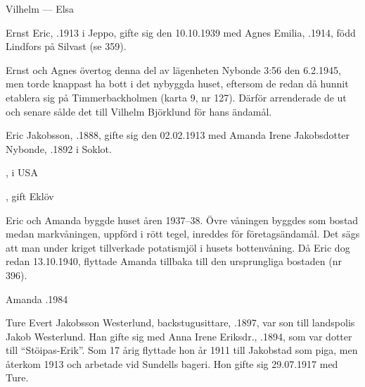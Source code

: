 Vilhelm   ---  Elsa 


Ernst Eric, .1913 i Jeppo, gifte sig den 10.10.1939 med Agnes Emilia, .1914, född Lindfors på Silvast (se 359).
\begin{jhchildren}
  \item {}
  \item {}
  \item {}
\end{jhchildren}

Ernst och Agnes övertog denna del av lägenheten Nybonde 3:56 den 6.2.1945, men torde knappast ha bott i det nybyggda huset, eftersom de redan då hunnit etablera sig på Timmerbackholmen (karta 9, nr 127). Därför arrenderade de ut och senare sålde det till Vilhelm Björklund för hans ändamål.


Eric Jakobsson, .1888, gifte sig den 02.02.1913 med Amanda Irene Jakobsdotter Nybonde, .1892 i Soklot.
\begin{jhchildren}
  \item {}, i USA
  \item {}
  \item {}, gift Eklöv
\end{jhchildren}

Eric och Amanda byggde huset åren 1937--38. Övre våningen byggdes som bostad medan markvåningen, uppförd i rött tegel, inreddes för 	företagsändamål. Det sägs att man under kriget tillverkade potatismjöl i husets  bottenvåning. Då Eric dog redan 13.10.1940, flyttade Amanda tillbaka till den ursprungliga bostaden (nr 396).

Amanda .1984





Ture Evert Jakobsson Westerlund, backstugusittare,  .1897, var son till landspolis Jakob Westerlund. Han gifte sig med Anna Irene Eriksdr., .1894, som var dotter till ``Stöipas-Erik''.
Som 17 årig flyttade hon år 1911 till Jakobstad som piga, men återkom 1913 och arbetade vid Sundells bageri. Hon gifte sig 29.07.1917 med Ture.

